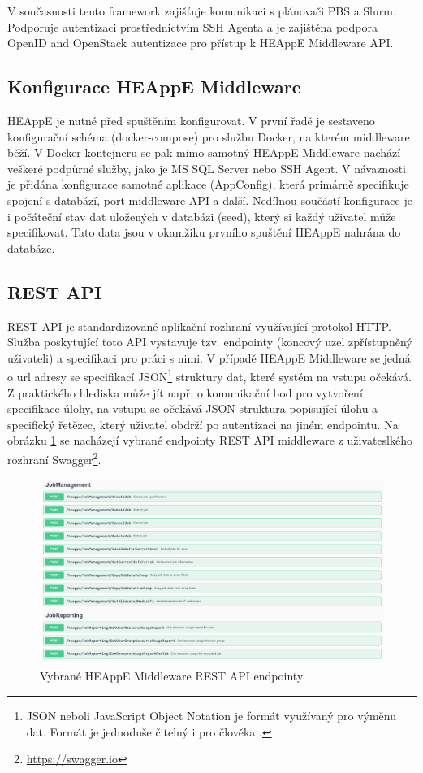 V současnosti tento framework zajišťuje komunikaci s plánovači PBS a Slurm. Podporuje autentizaci prostřednictvím SSH Agenta a je zajištěna podpora OpenID and OpenStack autentizace pro přístup k HEAppE Middleware API.

\subsection{Konfigurace HEAppE Middleware}
HEAppE je nutné před spuštěním konfigurovat. V první řadě je sestaveno konfigurační schéma (docker-compose) pro službu Docker, na kterém middleware běží. V Docker kontejneru se pak mimo samotný HEAppE Middleware nachází veškeré podpůrné služby, jako je MS SQL Server nebo SSH Agent. V návaznosti je přidána konfigurace samotné aplikace (AppConfig), která primárně specifikuje spojení s databází, port middleware API a další. Nedílnou součástí konfigurace je i počáteční stav dat uložených v databázi (seed), který si každý uživatel může specifikovat. Tato data jsou v okamžiku prvního spuštění HEAppE nahrána do databáze.

\subsection{REST API}
REST API je standardizované aplikační rozhraní využívající protokol HTTP. Služba poskytující toto API vystavuje tzv. endpointy (koncový uzel zpřístupněný uživateli) a specifikaci pro práci s nimi. V případě HEAppE Middleware se jedná o url adresy se specifikací JSON\footnote{JSON neboli JavaScript Object Notation je formát využívaný pro výměnu dat. Formát je jednoduše čitelný i pro člověka \cite{lJoeVuQg92zsjaAe}.} struktury dat, které systém na vstupu očekává. Z praktického hlediska může jít např. o komunikační bod pro vytvoření specifikace úlohy, na vstupu se očekává JSON struktura popisující úlohu a specifický řetězec, který uživatel obdrží po autentizaci na jiném endpointu. Na obrázku \ref{fig:swagger} se nacházejí vybrané endpointy REST API middleware z uživateslkého rozhraní Swagger\footnote{\href{https://swagger.io}{https://swagger.io}}.


\begin{figure}
	\centering
	\includegraphics[width=1\textwidth]{Figures/swagger-ui.pdf}
	\caption{Vybrané HEAppE Middleware REST API endpointy}
	\label{fig:swagger}
\end{figure}


